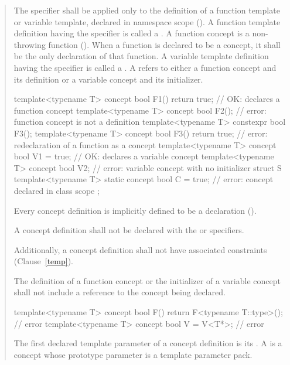 \begin{quote}

\pnum
The  specifier shall be applied only to the 
definition of a function template or variable template, declared
in namespace scope ().
%
A function template definition having the 
specifier is called a . A function
concept is a non-throwing function ().
%
When a function is declared to be a concept, it shall be the only
declaration of that function.
%
A variable template definition having the  
specifier is called a .
%
A  refers to either a function concept 
and its definition or a variable concept and its initializer.
%
\enterexample
\begin{codeblock}
template<typename T> 
  concept bool F1() { return true; } // OK: declares a function concept
template<typename T> 
  concept bool F2();                 // error: function concept is not a definition
template<typename T> constexpr bool F3();
template<typename T>
  concept bool F3() { return true; } // error: redeclaration of a function as a concept
template<typename T> 
  concept bool V1 = true;            // OK: declares a variable concept
template<typename T> 
  concept bool V2;                   // error: variable concept with no initializer
struct S {
  template<typename T> 
    static concept bool C = true;    // error: concept declared in class scope
};
\end{codeblock}
\exitexample

\pnum
Every concept definition is implicitly defined to be a 
 declaration ().

\pnum
A concept definition shall not be declared with the 
 or  specifiers. 

\pnum
Additionally, a concept definition shall not have associated constraints
(Clause~\ref{temp}).

\pnum
The definition of a function concept or the initializer of
a variable concept shall not include a reference to the concept being
declared.
%
\enterexample
\begin{codeblock}
template<typename T>
  concept bool F() { return F<typename T::type>(); } // error
template<typename T>
  concept bool V = V<T*>;                            // error
\end{codeblock}
\exitexample

\pnum
The first declared template parameter of a concept definition is its
. 
%
A  is a concept whose prototype parameter
is a template parameter pack.


\end{quote}
